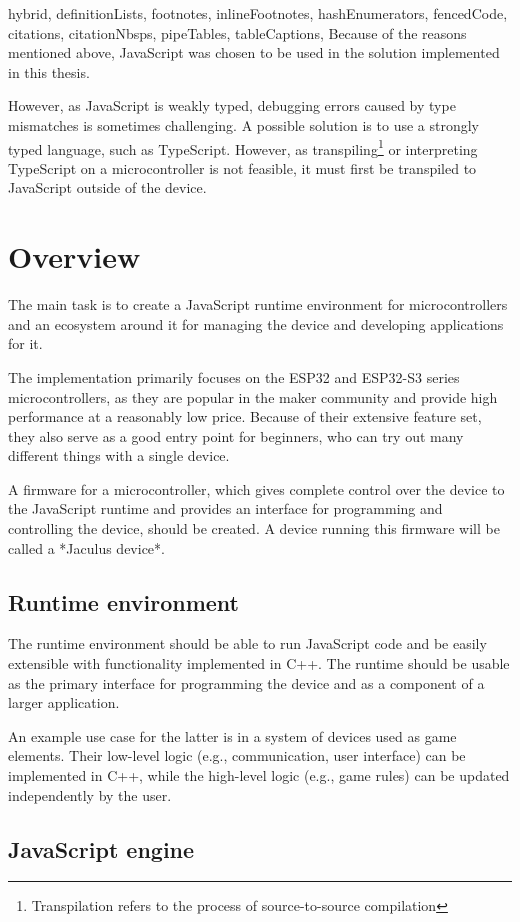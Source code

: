 \begin{markdown*}{%
  hybrid,
  definitionLists,
  footnotes,
  inlineFootnotes,
  hashEnumerators,
  fencedCode,
  citations,
  citationNbsps,
  pipeTables,
  tableCaptions,
}
Because of the reasons mentioned above, JavaScript was chosen to be used in the solution implemented in this thesis.

However, as JavaScript is weakly typed, debugging errors caused by type mismatches is sometimes challenging. A possible solution is to use a strongly typed language, such as TypeScript. However, as transpiling\footnote{Transpilation refers to the process of source-to-source compilation} or interpreting TypeScript on a microcontroller is not feasible, it must first be transpiled to JavaScript outside of the device.


\chapter{Overview}

The main task is to create a JavaScript runtime environment for microcontrollers and an ecosystem around it for managing the device and developing applications for it.

The implementation primarily focuses on the ESP32 and ESP32-S3 series microcontrollers, as they are popular in the maker community and provide high performance at a reasonably low price. Because of their extensive feature set, they also serve as a good entry point for beginners, who can try out many different things with a single device.

A firmware for a microcontroller, which gives complete control over the device to the JavaScript runtime and provides an interface for programming and controlling the device, should be created. A device running this firmware will be called a *Jaculus device*.

\section{Runtime environment}

The runtime environment should be able to run JavaScript code and be easily extensible with functionality implemented in C++. The runtime should be usable as the primary interface for programming the device and as a component of a larger application.

An example use case for the latter is in a system of devices used as game elements. Their low-level logic (e.g., communication, user interface) can be implemented in C++, while the high-level logic (e.g., game rules) can be updated independently by the user.

\section{JavaScript engine}


\end{markdown*}
